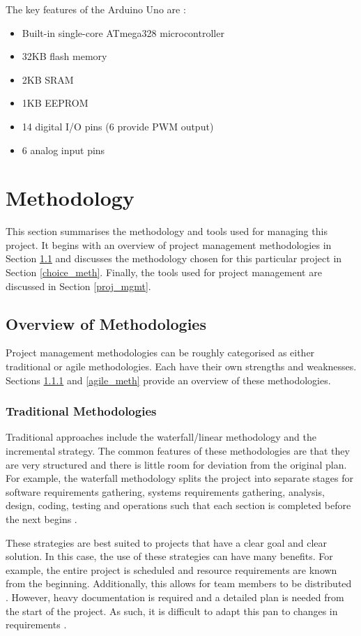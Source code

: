 \documentclass{UoYCSproject}
\begin{document}
The key features of the Arduino Uno are \parencite{arduinospec}:
\begin{itemize}
\item Built-in single-core ATmega328 microcontroller
\item 32KB flash memory
\item 2KB SRAM
\item 1KB EEPROM
\item 14 digital I/O pins (6 provide PWM output)
\item 6 analog input pins
\end{itemize}

\chapter{Methodology}
This section summarises the methodology and tools used for managing this project. It begins with an overview of project management methodologies in Section \ref{overview_meth} and discusses the methodology chosen for this particular project in Section \ref{choice_meth}. Finally, the tools used for project management are discussed in Section \ref{proj_mgmt}.

\section{Overview of Methodologies} \label{overview_meth}
Project management methodologies can be roughly categorised as either traditional or agile methodologies. Each have their own strengths and weaknesses. Sections \ref{trad_meth} and \ref{agile_meth} provide an overview of these methodologies.
\subsection{Traditional Methodologies} \label{trad_meth}
Traditional approaches include the waterfall/linear methodology and the incremental strategy. The common features of these methodologies are that they are very structured and there is little room for deviation from the original plan. For example, the waterfall methodology splits the project into separate stages for software requirements gathering, systems requirements gathering, analysis, design, coding, testing and operations such that each section is completed before the next begins \parencite{royce1987managing}.

These strategies are best suited to projects that have a clear goal and clear solution. In this case, the use of these strategies can have many benefits. For example, the entire project is scheduled and resource requirements are known from the beginning. Additionally, this allows for team members to be distributed \parencite{fernandez2008agile}. However, heavy documentation is required and a detailed plan is needed from the start of the project. As such, it is difficult to adapt this pan to changes in requirements \parencite{fernandez2008agile}.
\end{document}
